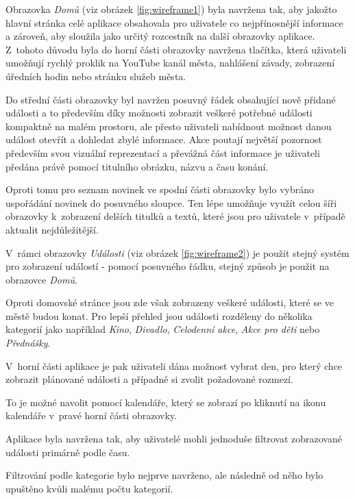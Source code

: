 \pagebreak
\begin{minipage}[t]{0.45\textwidth}
  Obrazovka \textit{Domů} (viz obrázek \ref{fig:wireframe1}) byla navržena tak, aby jakožto hlavní stránka celé aplikace obsahovala pro uživatele
  co nejpřínosnější informace a zároveň, aby sloužila jako určitý rozcestník na další obrazovky aplikace. Z~tohoto důvodu byla do horní části obrazovky
  navržena tlačítka, která uživateli umožňují rychlý proklik na YouTube kanál města, nahlášení závady, zobrazení úředních hodin nebo stránku služeb města.
  

  Do střední části obrazovky byl navržen posuvný řádek obsahující nově přidané události a to především díky možnosti zobrazit
  veškeré potřebné události kompaktně na malém prostoru, ale přesto uživateli nabídnout možnost danou událost otevřít a dohledat zbylé informace.
  Akce poutají největší pozornost především svou vizuální reprezentací a převážná část informace je uživateli předána právě pomocí titulního obrázku, názvu
  a času konání.
  
  Oproti tomu pro seznam novinek ve spodní části obrazovky bylo vybráno uspořádání novinek do posuvného sloupce. Ten lépe umožňuje 
  využít celou šíři obrazovky k~zobrazení delších titulků a textů, které jsou pro uživatele v~případě aktualit nejdůležitější.
  
  
  
  
  \bigskip
  V~rámci obrazovky \textit{Události} (viz obrázek \ref{fig:wireframe2}) je použit stejný systém pro zobrazení událostí - pomocí posuvného řádku, 
  stejný způsob je použit na obrazovce \textit{Domů}.
  
  Oproti domovské stránce jsou zde však zobrazeny veškeré události, které se ve městě budou konat. Pro lepší přehled jsou události rozděleny 
  do několika kategorií jako například \textit{Kino}, \textit{Divadlo}, \textit{Celodenní akce}, \textit{Akce pro děti} nebo \textit{Přednášky}.
  
  V~horní části aplikace je pak uživateli dána možnost vybrat den, pro který chce zobrazit plánované události a případně si zvolit požadované rozmezí.

  To je možné navolit pomocí kalendáře, který se zobrazí po kliknutí na ikonu kalendáře v~pravé horní části obrazovky.
  
  
  
  Aplikace byla navržena tak, aby uživatelé mohli jednoduše filtrovat zobrazované události primárně podle času.
  
  Filtrování podle kategorie bylo nejprve navrženo, ale následně od něho bylo upuštěno kvůli malému počtu kategorií.
  

 
\end{minipage}
